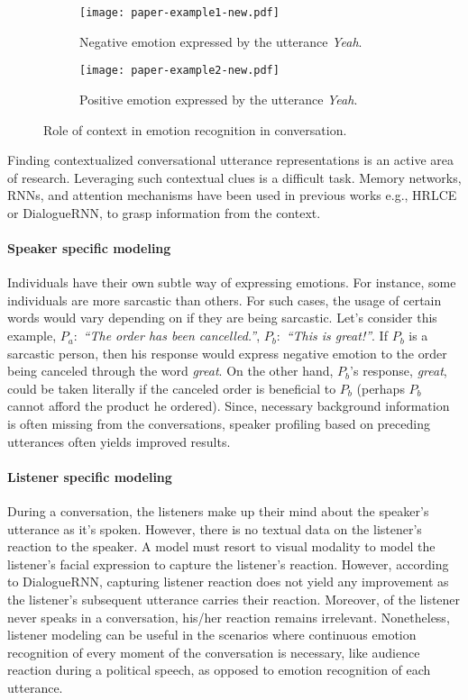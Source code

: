 \documentclass{IEEEtran}\usepackage[pdftex]{graphicx}
\begin{document}
	\begin{figure*}[!htbp]
		\centering
		\begin{subfigure}{0.49\textwidth}
			\centering
			\texttt{[image: paper-example1-new.pdf]}
			\caption{Negative emotion expressed by the utterance \emph{Yeah}.}
			\label{fig:context1}
		\end{subfigure}
		\begin{subfigure}{0.49\textwidth}
			\centering
			\texttt{[image: paper-example2-new.pdf]}
			\caption{Positive emotion expressed by the utterance \emph{Yeah}.}
			\label{fig:context2}
		\end{subfigure}\caption{Role of context in emotion recognition in conversation.}
	\end{figure*}
	Finding contextualized conversational utterance representations is an active area of research. Leveraging such contextual clues is a difficult task. Memory networks, RNNs, and attention mechanisms have been used in previous works e.g., HRLCE or DialogueRNN, to grasp information from the context.
	
	\paragraph{Speaker specific modeling}
	
	Individuals have their own subtle way of expressing emotions. For instance, some individuals are more sarcastic than
	others. For such cases, the usage of certain words would vary depending on if they are being sarcastic. 
	Let's consider this example, $P_a:$ \textit{``The order has been cancelled.''}, $P_b:$ \textit{``This is great!''}. If $P_b$ is
	a sarcastic person, then his response would express negative emotion to the order being canceled through the word \textit{great}. On the other hand, $P_b$'s
	response, \textit{great}, could be taken literally if the canceled order is beneficial to $P_b$ (perhaps $P_b$ cannot afford the product he ordered). Since, necessary background
	information is often missing from the conversations, speaker profiling based on preceding utterances often yields improved
	results.
	
	\paragraph{Listener specific modeling}
	
	During a conversation, the listeners make up their mind about the speaker's utterance as it's
	spoken. However, there is no textual data on the listener's reaction to the speaker. A model
	must resort to visual modality to model the listener's facial expression to capture the
	listener's reaction. However, according to DialogueRNN, capturing listener
	reaction does not yield any improvement as the listener's subsequent utterance carries their
	reaction. Moreover, of the listener never speaks in a conversation, his/her reaction remains
	irrelevant. Nonetheless, listener modeling can be useful in the scenarios where continuous
	emotion recognition of every moment of the conversation is necessary, like audience reaction
	during a political speech, as opposed to emotion recognition of each utterance.
	
\end{document}
